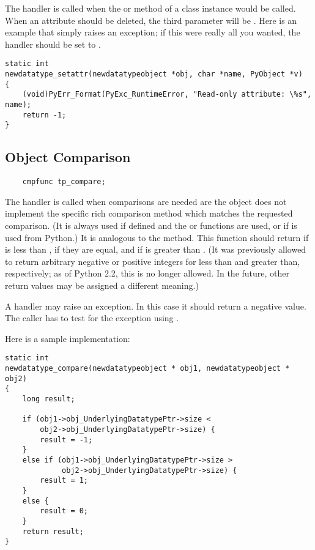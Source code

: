 The  handler is called when the
 or  method of a class
instance would be called.  When an attribute should be deleted, the
third parameter will be \NULL.  Here is an example that simply raises
an exception; if this were really all you wanted, the
 handler should be set to \NULL.
   
\begin{verbatim}
static int
newdatatype_setattr(newdatatypeobject *obj, char *name, PyObject *v)
{
    (void)PyErr_Format(PyExc_RuntimeError, "Read-only attribute: \%s", name);
    return -1;
}
\end{verbatim}


\subsection{Object Comparison}

\begin{verbatim}
    cmpfunc tp_compare;
\end{verbatim}

The  handler is called when comparisons are needed
are the object does not implement the specific rich comparison method
which matches the requested comparison.  (It is always used if defined
and the  or 
functions are used, or if  is used from Python.)
It is analogous to the  method.  This function
should return  if  is less than
,  if they are equal, and  if
 is greater than
.
(It was previously allowed to return arbitrary negative or positive
integers for less than and greater than, respectively; as of Python
2.2, this is no longer allowed.  In the future, other return values
may be assigned a different meaning.)

A  handler may raise an exception.  In this case it
should return a negative value.  The caller has to test for the
exception using .


Here is a sample implementation:

\begin{verbatim}
static int
newdatatype_compare(newdatatypeobject * obj1, newdatatypeobject * obj2)
{
    long result;
 
    if (obj1->obj_UnderlyingDatatypePtr->size <
        obj2->obj_UnderlyingDatatypePtr->size) {
        result = -1;
    }
    else if (obj1->obj_UnderlyingDatatypePtr->size >
             obj2->obj_UnderlyingDatatypePtr->size) {
        result = 1;
    }
    else {
        result = 0;
    }
    return result;
}
\end{verbatim}


